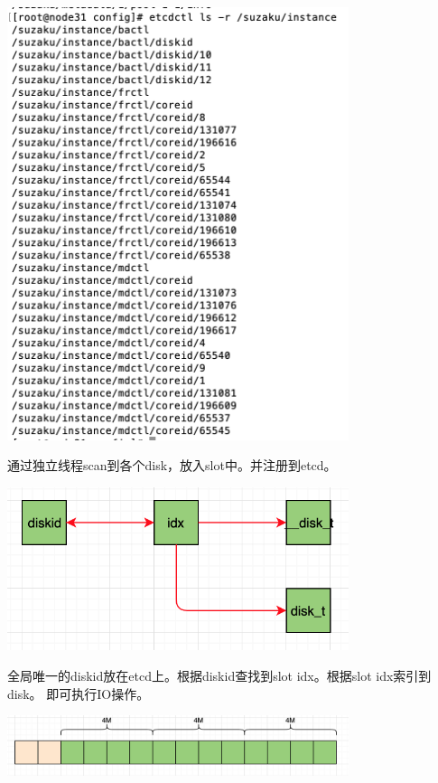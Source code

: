 \begin{center}
\includegraphics[width=10cm]{../imgs/etcd-suzaku-instance.png}
\end{center}

通过独立线程scan到各个disk，放入slot中。并注册到etcd。

\begin{center}
\includegraphics[width=10cm]{../imgs/diskid-slot.png}
\end{center}

全局唯一的diskid放在etcd上。根据diskid查找到slot idx。根据slot idx索引到disk。
即可执行IO操作。

\begin{center}
\includegraphics[width=10cm]{../imgs/disk-layout.png}
\end{center}

